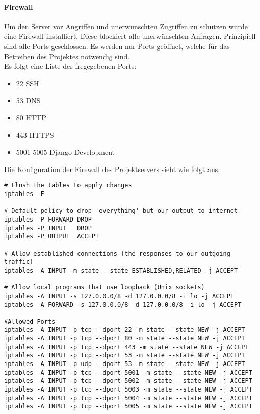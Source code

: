 \paragraph{Firewall}
Um den Server vor Angriffen und unerwünschten Zugriffen zu schützen wurde eine Firewall installiert. Diese blockiert alle unerwünschten Anfragen. Prinzipiell sind alle Ports geschlossen. Es werden nur Ports geöffnet, welche für das Betreiben des Projektes notwendig sind.\\
Es folgt eine Liste der fregegebenen Ports:
\begin{itemize}
\item 22	SSH
\item 53	\gls{DNS}
\item 80	\gls{HTTP}
\item 443	\gls{HTTPS}
\item 5001-5005 Django Development
\end{itemize}

Die Konfiguration der Firewall des Projektservers sieht wie folgt aus:
\begin{lstlisting}[caption = Firewall Rules des Projektservers, label = firewall1]
# Flush the tables to apply changes
iptables -F

# Default policy to drop 'everything' but our output to internet
iptables -P FORWARD DROP
iptables -P INPUT   DROP
iptables -P OUTPUT  ACCEPT

# Allow established connections (the responses to our outgoing traffic)
iptables -A INPUT -m state --state ESTABLISHED,RELATED -j ACCEPT

# Allow local programs that use loopback (Unix sockets)
iptables -A INPUT -s 127.0.0.0/8 -d 127.0.0.0/8 -i lo -j ACCEPT
iptables -A FORWARD -s 127.0.0.0/8 -d 127.0.0.0/8 -i lo -j ACCEPT

#Allowed Ports
iptables -A INPUT -p tcp --dport 22 -m state --state NEW -j ACCEPT
iptables -A INPUT -p tcp --dport 80 -m state --state NEW -j ACCEPT
iptables -A INPUT -p tcp --dport 443 -m state --state NEW -j ACCEPT
iptables -A INPUT -p tcp --dport 53 -m state --state NEW -j ACCEPT
iptables -A INPUT -p udp --dport 53 -m state --state NEW -j ACCEPT
iptables -A INPUT -p tcp --dport 5001 -m state --state NEW -j ACCEPT
iptables -A INPUT -p tcp --dport 5002 -m state --state NEW -j ACCEPT
iptables -A INPUT -p tcp --dport 5003 -m state --state NEW -j ACCEPT
iptables -A INPUT -p tcp --dport 5004 -m state --state NEW -j ACCEPT
iptables -A INPUT -p tcp --dport 5005 -m state --state NEW -j ACCEPT
\end{lstlisting}

